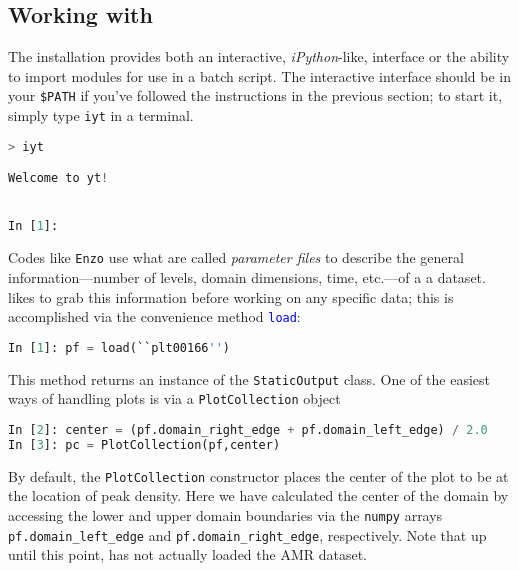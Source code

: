 \subsection{Working with \yt}
The \yt installation provides both an interactive, {\it iPython}-like,
interface or the ability to import \yt modules for use in a batch
script.  The interactive interface should be in your {\tt \$PATH} if
you've followed the instructions in the previous section; to start it,
simply type {\tt iyt} in a terminal.
\begin{lstlisting}[language=Python]
> iyt

Welcome to yt!


In [1]: 
\end{lstlisting}
Codes like {\tt Enzo} use what are called {\it parameter files} to
describe the general information---number of levels, domain
dimensions, time, etc.---of a a dataset.  \yt likes to grab this
information before working on any specific data; this is accomplished
via the convenience method \textcolor{blue}{\tt load}:
\begin{lstlisting}[language=Python]
In [1]: pf = load(``plt00166'')
\end{lstlisting}
This method returns an instance of the {\tt StaticOutput} class.  One
of the easiest ways of handling plots is via a {\tt PlotCollection}
object
\begin{lstlisting}[language=Python]
In [2]: center = (pf.domain_right_edge + pf.domain_left_edge) / 2.0
In [3]: pc = PlotCollection(pf,center)
\end{lstlisting}
By default, the {\tt PlotCollection} constructor places the center of
the plot to be at the location of peak density.  Here we have
calculated the center of the domain by accessing the lower and upper
domain boundaries via the {\tt numpy} arrays {\tt
  pf.domain\_left\_edge} and {\tt pf.domain\_right\_edge},
respectively.  Note that up until this point, \yt has not actually
loaded the AMR dataset.

